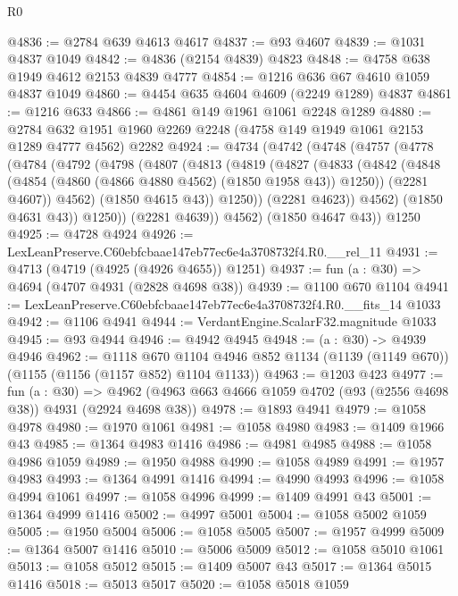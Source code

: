 \begin{lexlean}{R0}
\begin{coremodule}
@4836 := @2784 @639 @4613 @4617
@4837 := @93 @4607
@4839 := @1031 @4837 @1049
@4842 := @4836 (@2154 @4839) @4823
@4848 := @4758 @638 @1949 @4612 @2153 @4839 @4777
@4854 := @1216 @636 @67 @4610 @1059 @4837 @1049
@4860 := @4454 @635 @4604 @4609 (@2249 @1289) @4837
@4861 := @1216 @633
@4866 := @4861 @149 @1961 @1061 @2248 @1289
@4880 := @2784 @632 @1951 @1960 @2269 @2248 (@4758 @149 @1949 @1061 @2153 @1289 @4777 @4562) @2282
@4924 := @4734
    (@4742
      (@4748
        (@4757
          (@4778
            (@4784
              (@4792
                (@4798
                  (@4807
                    (@4813
                      (@4819
                        (@4827
                          (@4833
                            (@4842
                              (@4848 (@4854 (@4860 (@4866 @4880 @4562) (@1850 @1958 @43)) @1250))
                              (@2281 @4607))
                            @4562)
                          (@1850 @4615 @43))
                        @1250))
                    (@2281 @4623))
                  @4562)
                (@1850 @4631 @43))
              @1250))
          (@2281 @4639))
        @4562)
      (@1850 @4647 @43))
    @1250
@4925 := @4728 @4924
@4926 := LexLeanPreserve.C60ebfcbaae147eb77ec6e4a3708732f4.R0.__rel_11
@4931 := @4713 (@4719 (@4925 (@4926 @4655)) @1251)
@4937 := fun (a : @30) => @4694 (@4707 @4931 (@2828 @4698 @38))
@4939 := @1100 @670 @1104
@4941 := LexLeanPreserve.C60ebfcbaae147eb77ec6e4a3708732f4.R0.__fits_14 @1033
@4942 := @1106 @4941
@4944 := VerdantEngine.ScalarF32.magnitude @1033
@4945 := @93 @4944
@4946 := @4942 @4945
@4948 := (a : @30) -> @4939 @4946
@4962 := @1118
    @670
    @1104
    @4946
    @852
    @1134
    (@1139 (@1149 @670))
    (@1155 (@1156 (@1157 @852) @1104 @1133))
@4963 := @1203 @423
@4977 := fun (a : @30) =>
  @4962 (@4963 @663 @4666 @1059 @4702 (@93 (@2556 @4698 @38)) @4931 (@2924 @4698 @38))
@4978 := @1893 @4941
@4979 := @1058 @4978
@4980 := @1970 @1061
@4981 := @1058 @4980
@4983 := @1409 @1966 @43
@4985 := @1364 @4983 @1416
@4986 := @4981 @4985
@4988 := @1058 @4986 @1059
@4989 := @1950 @4988
@4990 := @1058 @4989
@4991 := @1957 @4983
@4993 := @1364 @4991 @1416
@4994 := @4990 @4993
@4996 := @1058 @4994 @1061
@4997 := @1058 @4996
@4999 := @1409 @4991 @43
@5001 := @1364 @4999 @1416
@5002 := @4997 @5001
@5004 := @1058 @5002 @1059
@5005 := @1950 @5004
@5006 := @1058 @5005
@5007 := @1957 @4999
@5009 := @1364 @5007 @1416
@5010 := @5006 @5009
@5012 := @1058 @5010 @1061
@5013 := @1058 @5012
@5015 := @1409 @5007 @43
@5017 := @1364 @5015 @1416
@5018 := @5013 @5017
@5020 := @1058 @5018 @1059

\end{coremodule}
\end{lexlean}
